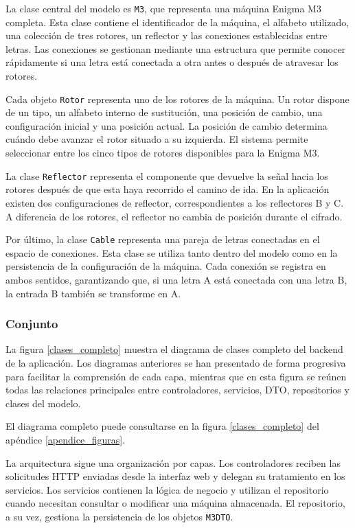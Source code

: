 La clase central del modelo es \texttt{M3}, que representa una máquina Enigma M3 completa. Esta clase contiene el identificador de la máquina, el alfabeto utilizado, una colección de tres rotores, un reflector y las conexiones establecidas entre letras. Las conexiones se gestionan mediante una estructura que permite conocer rápidamente si una letra está conectada a otra antes o después de atravesar los rotores.

Cada objeto \texttt{Rotor} representa uno de los rotores de la máquina. Un rotor dispone de un tipo, un alfabeto interno de sustitución, una posición de cambio, una configuración inicial y una posición actual. La posición de cambio determina cuándo debe avanzar el rotor situado a su izquierda. El sistema permite seleccionar entre los cinco tipos de rotores disponibles para la Enigma M3.

La clase \texttt{Reflector} representa el componente que devuelve la señal hacia los rotores después de que esta haya recorrido el camino de ida. En la aplicación existen dos configuraciones de reflector, correspondientes a los reflectores B y C. A diferencia de los rotores, el reflector no cambia de posición durante el cifrado.

Por último, la clase \texttt{Cable} representa una pareja de letras conectadas en el espacio de conexiones. Esta clase se utiliza tanto dentro del modelo como en la persistencia de la configuración de la máquina. Cada conexión se registra en ambos sentidos, garantizando que, si una letra A está conectada con una letra B, la entrada B también se transforme en A.

\subsubsection{Conjunto}

La figura \ref{clases_completo} muestra el diagrama de clases completo del backend de la aplicación. Los diagramas anteriores se han presentado de forma progresiva para facilitar la comprensión de cada capa, mientras que en esta figura se reúnen todas las relaciones principales entre controladores, servicios, DTO, repositorios y clases del modelo.

El diagrama completo puede consultarse en la figura \ref{clases_completo} del apéndice \ref{apendice_figuras}.

La arquitectura sigue una organización por capas. Los controladores reciben las solicitudes HTTP enviadas desde la interfaz web y delegan su tratamiento en los servicios. Los servicios contienen la lógica de negocio y utilizan el repositorio cuando necesitan consultar o modificar una máquina almacenada. El repositorio, a su vez, gestiona la persistencia de los objetos \texttt{M3DTO}.

